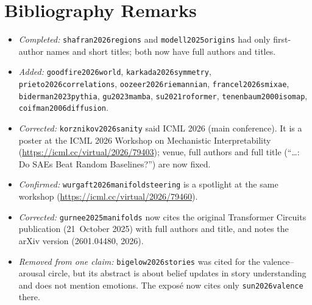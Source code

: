 \documentclass[11pt,a4paper]{article}
\begin{document}
\section{Bibliography Remarks}\label{sec:bib}
\begin{itemize}[before=\raggedright]
  \item \textit{Completed:} \texttt{shafran2026regions} and
    \texttt{modell2025origins} had only first-author names and short
    titles; both now have full authors and titles.
  \item \textit{Added:} \texttt{goodfire2026world},
    \texttt{karkada2026symmetry}, \texttt{prieto2026correlations},
    \texttt{oozeer2026riemannian}, \texttt{francel2026smixae},
    \texttt{biderman2023pythia}, \texttt{gu2023mamba},
    \texttt{su2021roformer}, \texttt{tenenbaum2000isomap},
    \texttt{coifman2006diffusion}.
  \item \textit{Corrected:} \texttt{korznikov2026sanity} said ICML 2026
    (main conference). It is a poster at the ICML 2026 Workshop on
    Mechanistic Interpretability (\url{https://icml.cc/virtual/2026/79403});
    venue, full authors and full title (\enquote{\dots: Do SAEs Beat Random
    Baselines?}) are now fixed.
  \item \textit{Confirmed:} \texttt{wurgaft2026manifoldsteering} is a
    spotlight at the same workshop (\url{https://icml.cc/virtual/2026/79460}).
  \item \textit{Corrected:} \texttt{gurnee2025manifolds} now cites the
    original Transformer Circuits publication (21~October 2025) with full
    authors and title, and notes the arXiv version (2601.04480, 2026).
  \item \textit{Removed from one claim:} \texttt{bigelow2026stories} was
    cited for the valence--arousal circle, but its abstract is about belief
    updates in story understanding and does not mention emotions. The
    exposé now cites only \texttt{sun2026valence} there.
\end{itemize}

\end{document}
